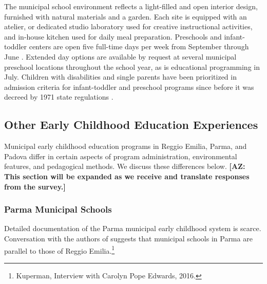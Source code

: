 The municipal school environment reflects a light-filled and open interior design, furnished with natural materials and a garden. Each site is equipped with an atelier, or dedicated studio laboratory used for creative instructional activities, and in-house kitchen used for daily meal preparation. Preschools and infant-toddler centers are open five full-time days per week from September through June \citep{Giudici-Nicolosi_2014_Reggio-Approach}. Extended day options are available by request at several municipal preschool locations throughout the school year, as is educational programming in July. Children with disabilities and single parents have been prioritized in admission criteria for infant-toddler and preschool programs since before it was decreed by 1971 state regulations \citep{Edwards-etal-eds_1998_Hundred-Languages}.


\subsection{Other Early Childhood Education Experiences}

Municipal early childhood education programs in Reggio Emilia, Parma, and Padova differ in certain aspects of program administration, environmental features, and pedagogical methods. We discuss these differences below. \textbf{[AZ: This section will be expanded as we receive and translate responses from the survey.]}

\subsubsection{Parma Municipal Schools}

Detailed documentation of the Parma municipal early childhood system is scarce. Conversation with the authors of \citet{Edwards-etal-eds_1998_Hundred-Languages} suggests that municipal schools in Parma are parallel to those of Reggio Emilia.\footnote{Kuperman, Interview with Carolyn Pope Edwards, 2016.} 

